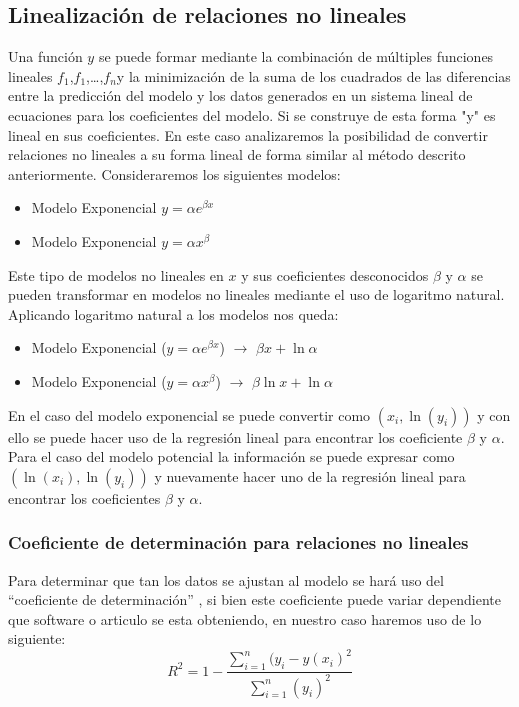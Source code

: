 \documentclass[11pt,letterpaper]{article}
\begin{document}
\subsection{Linealización de relaciones no lineales}
Una función $y$ se puede formar mediante la combinación de múltiples funciones lineales $f_1$,$f_1$,\dots,$f_n$y la minimización de la suma de los cuadrados de las diferencias entre la predicción del modelo y los datos generados en un sistema lineal de ecuaciones para los coeficientes del modelo. Si se construye de esta forma "y" es lineal en sus coeficientes. En este caso analizaremos la posibilidad de convertir relaciones no lineales a su forma lineal de forma similar al método descrito anteriormente.\cite{ualberta} Consideraremos los siguientes modelos:
\begin{itemize}
	\item Modelo Exponencial $y = \alpha e^{\beta x}$
	\item Modelo Exponencial $y = \alpha x^{\beta}$
\end{itemize}
\par Este tipo de modelos no lineales en $x$ y sus coeficientes desconocidos $\beta$ y $\alpha$ se pueden transformar en modelos no lineales mediante el uso de logaritmo natural. Aplicando logaritmo natural a los modelos nos queda:
\begin{itemize}
	\item Modelo Exponencial ($y = \alpha e^{\beta x}$) $\longrightarrow$ $\beta x + \ln \alpha$
	\item Modelo Exponencial ($y = \alpha x^{\beta}$) $\longrightarrow$ $\beta \ln x + \ln \alpha$
\end{itemize}
\par 
En el caso del modelo exponencial se puede convertir como $(x_i, \ln(y_i))$ y con ello se puede hacer uso de la regresión lineal  para encontrar los coeficiente $\beta$ y $\alpha$. Para el caso del modelo potencial la información se puede expresar como $(\ln(x_i), \ln(y_i))$ y nuevamente hacer uno de la regresión lineal para encontrar los coeficientes $\beta$ y $\alpha$.\cite{ualberta}\cite{nieves2011metodos} 

\subsubsection{Coeficiente de determinación para relaciones no lineales}
Para determinar que tan los datos se ajustan al modelo se hará uso del ``coeficiente de determinación'' , si bien este coeficiente puede variar dependiente que software o articulo se esta obteniendo, en nuestro caso haremos uso de lo siguiente:
\begin{equation}\label{equation:coeficiente}
	R^2 = 1 - \frac{\sum_{i=1}^{n} (y_i - y(x_i ) ^2 }
	{\sum_{i=1}^{n} (y_i)^2}
\end{equation}
\end{document}
